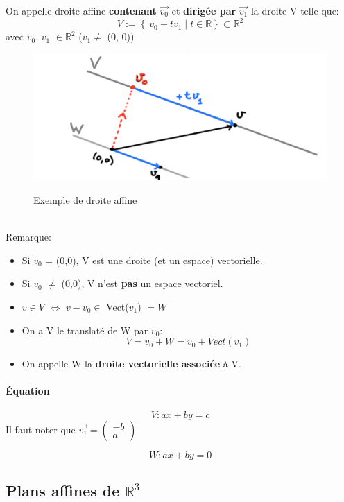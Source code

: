 \documentclass[10pt,a4paper]{book}
\newcommand{\R}{\mathbb{R}}
\begin{document}
On appelle droite affine \textbf{contenant} $\vec{v_0}$ et \textbf{dirigée par} $\vec{v_1}$ la droite V telle que:
\[V:= \left\lbrace\ v_0 + tv_1 \;|\; t \in \R \right\rbrace \subset \R^2\]
avec $v_0$, $v_1$ $\in \R^2$ ($v_1 \neq$ (0, 0))
\begin{figure}[h!]
\begin{center}
\includegraphics[scale=0.8]{./assets/schema_droites_affines.png}
\label{fig:droites_affines}
\caption{Exemple de droite affine}
\end{center}
\end{figure}
\\ Remarque: 
\begin{itemize}
\item Si $v_0$ = (0,0), V est une droite (et un espace) vectorielle.
\item Si $v_0$ $\neq$ (0,0), V n'est \textbf{pas} un espace vectoriel.
\item $v \in V$ $\Leftrightarrow$ $v-v_0 \in$ Vect($v_1$) $= W$
\item On a V le translaté de W par $v_0$:
\[V = v_0 + W = v_0 + Vect(v_1)\]
\item On appelle W la \textbf{droite vectorielle associée} à V.
\end{itemize}

\paragraph{Équation}
\[V: ax+by = c \tag*{Équation de la droite}\]
Il faut noter que $\vec{v_1} = \left( \begin{array}{c} -b \\ a \end{array} \right)$

\[W: ax+by= 0 \tag*{Équation de la droite vectorielle associée}\]

\subsection{Plans affines de \texorpdfstring{$\R^3$}{R3}}
\end{document}
